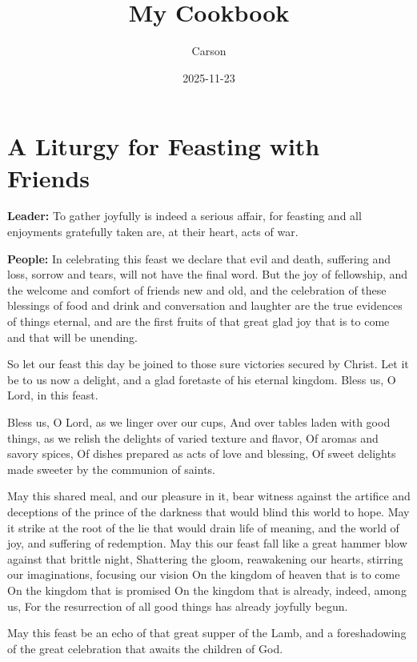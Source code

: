 \documentclass[
  letterpaper,
  DIV=11,
  numbers=noendperiod,
  titlepage=false]{scrreprt}
\title{My Cookbook}
\author{Carson}
\date{2025-11-23}
\makeatletter
\renewcommand{\maketitle}{\bgroup\setlength{\parindent}{0pt}
\begin{flushleft}
  {\sffamily\huge\textbf{\MakeUppercase{\@title}}} \vspace{0.3cm} \newline
  {\Large {\@subtitle}} \newline
  \@author
\end{flushleft}\egroup
}
\let\oldtableofcontents\tableofcontents
\renewcommand{\tableofcontents}{
  \begingroup
  \let\clearpage\relax
  \let\cleardoublepage\relax
  \oldtableofcontents
  \endgroup
}
\makeatother
\begin{document}
\maketitle

\pagestyle{mystyle}


\chapter{A Liturgy for Feasting with
Friends}\label{a-liturgy-for-feasting-with-friends}

\tableofcontents

\textbf{Leader:} To gather joyfully is indeed a serious affair, for
feasting and all enjoyments gratefully taken are, at their heart, acts
of war.

\textbf{People:} In celebrating this feast we declare that evil and
death, suffering and loss, sorrow and tears, will not have the final
word. But the joy of fellowship, and the welcome and comfort of friends
new and old, and the celebration of these blessings of food and drink
and conversation and laughter are the true evidences of things eternal,
and are the first fruits of that great glad joy that is to come and that
will be unending.

So let our feast this day be joined to those sure victories secured by
Christ. Let it be to us now a delight, and a glad foretaste of his
eternal kingdom. Bless us, O Lord, in this feast.

Bless us, O Lord, as we linger over our cups, And over tables laden with
good things, as we relish the delights of varied texture and flavor, Of
aromas and savory spices, Of dishes prepared as acts of love and
blessing, Of sweet delights made sweeter by the communion of saints.

May this shared meal, and our pleasure in it, bear witness against the
artifice and deceptions of the prince of the darkness that would blind
this world to hope. May it strike at the root of the lie that would
drain life of meaning, and the world of joy, and suffering of
redemption. May this our feast fall like a great hammer blow against
that brittle night, Shattering the gloom, reawakening our hearts,
stirring our imaginations, focusing our vision On the kingdom of heaven
that is to come On the kingdom that is promised On the kingdom that is
already, indeed, among us, For the resurrection of all good things has
already joyfully begun.

May this feast be an echo of that great supper of the Lamb, and a
foreshadowing of the great celebration that awaits the children of God.
\end{document}
